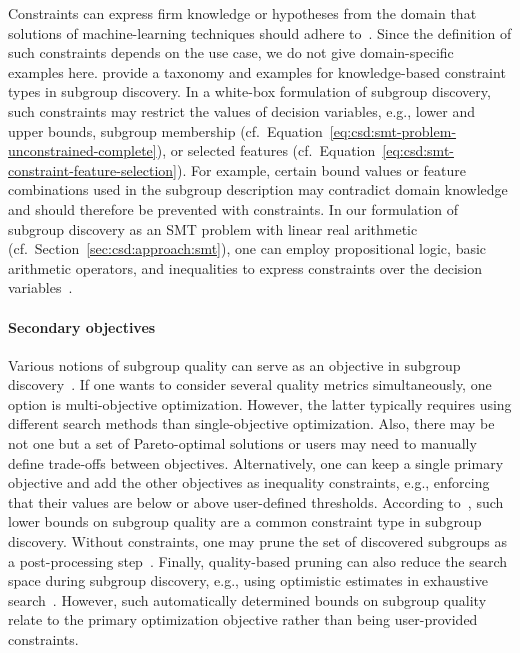 \documentclass{article}
\theoremstyle{definition}
\begin{document}
Constraints can express firm knowledge or hypotheses from the domain that solutions of machine-learning techniques should adhere to~\cite{bach2022empirical}.
Since the definition of such constraints depends on the use case, we do not give domain-specific examples here.
\cite{atzmueller2006methodological, atzmueller2005exploiting, atzmueller2007using} provide a taxonomy and examples for knowledge-based constraint types in subgroup discovery.
In a white-box formulation of subgroup discovery, such constraints may restrict the values of decision variables, e.g., lower and upper bounds, subgroup membership (cf.~Equation~\ref{eq:csd:smt-problem-unconstrained-complete}), or selected features (cf.~Equation~\ref{eq:csd:smt-constraint-feature-selection}).
For example, certain bound values or feature combinations used in the subgroup description may contradict domain knowledge and should therefore be prevented with constraints.
In our formulation of subgroup discovery as an SMT problem with linear real arithmetic (cf.~Section~\ref{sec:csd:approach:smt}), one can employ propositional logic, basic arithmetic operators, and inequalities to express constraints over the decision variables~\cite{barrett2018satisfiability}.

\paragraph{Secondary objectives}

Various notions of subgroup quality can serve as an objective in subgroup discovery~\cite{atzmueller2015subgroup, herrera2011overview}.
If one wants to consider several quality metrics simultaneously, one option is multi-objective optimization. However, the latter typically requires using different search methods than single-objective optimization.
Also, there may be not one but a set of Pareto-optimal solutions or users may need to manually define trade-offs between objectives.
Alternatively, one can keep a single primary objective and add the other objectives as inequality constraints, e.g., enforcing that their values are below or above user-defined thresholds.
According to~\cite{meeng2021real}, such lower bounds on subgroup quality are a common constraint type in subgroup discovery.
Without constraints, one may prune the set of discovered subgroups as a post-processing step~\cite{atzmueller2015subgroup}.
Finally, quality-based pruning can also reduce the search space during subgroup discovery, e.g., using optimistic estimates in exhaustive search~\cite{atzmueller2015subgroup, atzmueller2009fast, grosskreutz2009subgroup}.
However, such automatically determined bounds on subgroup quality relate to the primary optimization objective rather than being user-provided constraints.
\end{document}
